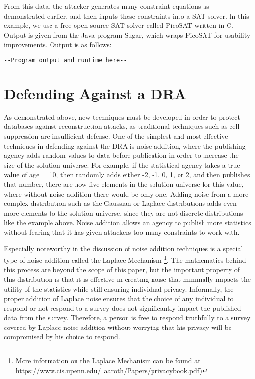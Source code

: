 \documentclass[jou,apacite]{apa6}
\begin{document}
From this data, the attacker generates many constraint equations as demonstrated earlier,
and then inputs these constraints into a SAT solver. In this example, we use a free open-source SAT solver
called PicoSAT written in C. Output is given from the Java program Sugar, which wraps PicoSAT for usability improvements.
\newline Output is as follows:
\begin{verbatim}
--Program output and runtime here--
\end{verbatim}

\section{Defending Against a DRA}
As demonstrated above, new techniques must be developed in
order to protect databases against reconstruction attacks, as traditional techniques such as cell suppression are insufficient defense. One of the simplest and most effective techniques in defending against the DRA is noise addition, where the publishing agency adds random values to data before publication in order to increase the size of the solution universe. For example, if the statistical agency takes a true value of age = 10, then randomly adds either -2, -1, 0, 1, or 2, and then publishes that number, there are now five elements in the solution universe for this value, where without noise addition there would be only one. Adding noise from a more complex distribution such as the Gaussian or Laplace distributions adds even more elements to the solution universe, since they are not discrete distributions like the example above. Noise addition allows an agency to publish more statistics without fearing that it has given attackers too many constraints to work with.

Especially noteworthy in the discussion of noise addition techniques is a special type of noise addition called the Laplace Mechanism \footnote{More information on the Laplace Mechanism can be found at https://www.cis.upenn.edu/~aaroth/Papers/privacybook.pdf)}.
The mathematics behind this process are beyond the scope of this paper, but the important property of this distribution is that it is effective in creating noise that minimally impacts the utility of the statistics while still ensuring individual privacy. Informally, the proper addition of Laplace noise ensures that the choice of any individual to respond or not respond to a survey does not significantly impact the published data from the survey. Therefore, a person is free to respond truthfully to a survey covered by Laplace noise addition without worrying that his privacy will be compromised by his choice to respond.
\end{document}
